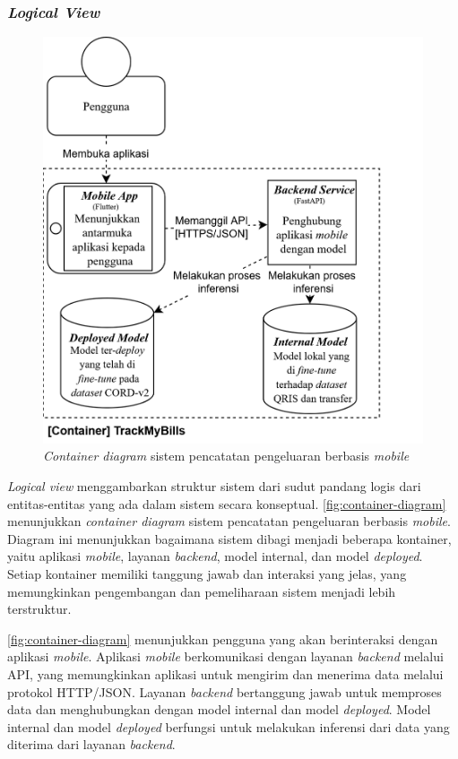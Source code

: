 \subsubsection{\emph{Logical View}}
\label{subsubsec:logical-view}

\begin{figure}[htbp]
    \centering
    \includegraphics[width=.8\textwidth]{images/container-diagram.png}
    \caption{\emph{Container diagram} sistem pencatatan pengeluaran berbasis \emph{mobile}}
    \label{fig:container-diagram}
\end{figure}

\emph{Logical view} menggambarkan struktur sistem dari sudut pandang logis dari entitas-entitas yang ada dalam sistem secara konseptual. \autoref{fig:container-diagram} menunjukkan \emph{container diagram} sistem pencatatan pengeluaran berbasis \emph{mobile}. Diagram ini menunjukkan bagaimana sistem dibagi menjadi beberapa kontainer, yaitu aplikasi \emph{mobile}, layanan \emph{backend}, model internal, dan model \emph{deployed}. Setiap kontainer memiliki tanggung jawab dan interaksi yang jelas, yang memungkinkan pengembangan dan pemeliharaan sistem menjadi lebih terstruktur.

\autoref{fig:container-diagram} menunjukkan pengguna yang akan berinteraksi dengan aplikasi \emph{mobile}. Aplikasi \emph{mobile} berkomunikasi dengan layanan \emph{backend} melalui API, yang memungkinkan aplikasi untuk mengirim dan menerima data melalui protokol HTTP/JSON. Layanan \emph{backend} bertanggung jawab untuk memproses data dan menghubungkan dengan model internal dan model \emph{deployed}. Model internal dan model \emph{deployed} berfungsi untuk melakukan inferensi dari data yang diterima dari layanan \emph{backend}.


